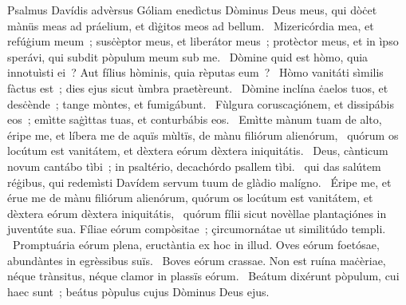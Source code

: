 { Psalmus Davídis advèrsus Góliam}
{%
enedìctus Dòminus Deus meus, qui dòċet mànüs meas ad práelium, et dìġitos meos ad bellum. 
~Mizericórdia mea, et refúġium meum~; susċèptor meus, et liberátor meus~; protèctor meus, et in ìpso sperávi, qui subdit pòpulum meum sub me. 
~Dòmine quid est hòmo, quia innotuìsti ei~? Aut fílius hòminis, quia rèputas eum~? 
~Hòmo vanitáti sìmilis fàctus est~; dies ejus sicut ùmbra praetèreunt. 
~Dòmine inclína ċaelos tuos, et desċènde~; tange mòntes, et fumigábunt. 
~Fùlgura coruscaçiónem, et dissipábis eos~; emìtte saġìttas tuas, et conturbábis eos. 
~Emìtte mànum tuam de alto, éripe me, et líbera me de aquïs mùltïs, de mànu filiórum alienórum, 
~quórum os locútum est vanitátem, et dèxtera eórum dèxtera iniquitátis. 
~Deus, cànticum novum cantábo tìbi~; in psaltério, decachórdo psallem tìbi. 
~qui das salútem réġibus, qui redemìsti Davídem servum tuum de glàdio malígno. 
~Éripe me, et érue me de mànu filiórum alienórum, quórum os locútum est vanitátem, et dèxtera eórum dèxtera iniquitátis, 
~quórum fílii sicut novèllae plantaçiónes in juventúte sua. Fíliae eórum compòsitae~; çircumornátae ut similitúdo templi. 
~Promptuária eórum plena, eructàntia ex hoc in illud. Oves eórum foetósae, abundàntes in egrèssibus suïs. 
~Boves eórum crassae. Non est ruína maċèriae, néque trànsitus, néque clamor in plassïs eórum. 
~Beátum dixérunt pòpulum, cui haec sunt~; beátus pòpulus cujus Dòminus Deus ejus. 
}

